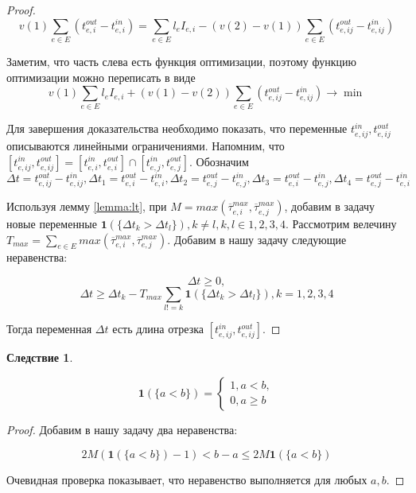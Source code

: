 \documentclass[12pt, a4paper]{article}
\DeclareMathOperator*{\minn}{min}
\newtheorem{corollary}{Следствие}[section]
\begin{document}
\begin{proof}
	$$v(1) \sum \limits _{e \in E} (t_{e, i}^{out} - t_{e, i}^{in}) = \sum \limits _{e \in E} l_e I_{e, i} - (v(2) - v(1)) \sum \limits _{e \in E} (t_{e, ij}^{out} - t_{e, ij}^{in})$$
	
	Заметим, что часть слева есть функция оптимизации, поэтому функцию оптимизации можно переписать в виде
	$$v(1) \sum \limits _{e \in E} l_e I_{e, i} + (v(1) - v(2))  \sum \limits _{e \in E} (t_{e, ij}^{out} - t_{e, ij}^{in}) \rightarrow \minn $$
	
	Для завершения доказательства необходимо показать, что переменные $t_{e, ij}^{in}, t_{e, ij}^{out}$ описываются линейными ограничениями. Напомним, что $[t_{e, ij}^{in}, t_{e, ij}^{out}] = [t_{e, i}^{in}, t_{e, i}^{out}] \cap [t_{e, j}^{in}, t_{e, j}^{out}]$. Обозначим $\Delta t = t_{e, ij}^{out} - t_{e, ij}^{in}, \Delta t_1 =  t_{e, i}^{out} - t_{e, i}^{in}, \Delta t_2 =  t_{e, j}^{out} - t_{e, j}^{in}, \Delta t_3 =  t_{e, i}^{out} - t_{e, j}^{in}, \Delta t_4 =  t_{e, j}^{out} - t_{e, i}^{in}$
	
	Используя лемму \ref{lemma:lt}, при $M = max (\overline{\tau}_{e, i}^{max}, \overline{\tau}_{e, j}^{max})$, добавим в задачу новые переменные $\textbf{1} (\{ \Delta t_k > \Delta t_l\}), k \ne l, k, l \in {1, 2, 3, 4}$. Рассмотрим велечину $T_{max} = \sum \limits_{e \in E} max (\overline{\tau}_{e, i}^{max}, \overline{\tau}_{e, j}^{max})$. Добавим в нашу задачу следующие неравенства: 
	
	$$\Delta t \ge 0, $$
	$$\Delta t \ge \Delta t_k - T_{max} \sum \limits_{l != k} {\textbf{1} (\{ \Delta t_k > \Delta t_l\})}, k = 1, 2, 3, 4$$
	
	Тогда переменная $\Delta t$ есть длина отрезка $[t_{e, ij}^{in}, t_{e, ij}^{out}]$. 
	
\end{proof}

\begin{corollary}
	\label{corollary:rel}
	
	
	\begin{equation*}
		\textbf{1} (\{a < b\}) = 
		\begin{cases}
			1, a < b,
			\\
			0, a \ge b
		\end{cases}
	\end{equation*}
	
\end{corollary}

\begin{proof}
	Добавим в нашу задачу два неравенства:
	
	$$ 2M (\textbf{1} (\{a < b\}) - 1) < b - a \le 2M\textbf{1} (\{a < b\}) $$
	
	Очевидная проверка показывает, что неравенство выполняется для любых $a, b$.
	
	
\end{proof}
\end{document}
